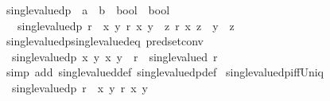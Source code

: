 \begin{isabellebody}
\isanewline
{}\isamarkupfalse%
\ single{\isacharunderscore}{\kern0pt}valuedp\ {\isacharcolon}{\kern0pt}{\isacharcolon}{\kern0pt}\ {\isachardoublequoteopen}{\isacharparenleft}{\kern0pt}{\isacharprime}{\kern0pt}a\ {\isasymRightarrow}\ {\isacharprime}{\kern0pt}b\ {\isasymRightarrow}\ bool{\isacharparenright}{\kern0pt}\ {\isasymRightarrow}\ bool{\isachardoublequoteclose}\isanewline
\ \ \ {\isachardoublequoteopen}single{\isacharunderscore}{\kern0pt}valuedp\ r\ {\isasymlongleftrightarrow}\ {\isacharparenleft}{\kern0pt}{\isasymforall}x\ y{\isachardot}{\kern0pt}\ r\ x\ y\ {\isasymlongrightarrow}\ {\isacharparenleft}{\kern0pt}{\isasymforall}z{\isachardot}{\kern0pt}\ r\ x\ z\ {\isasymlongrightarrow}\ y\ {\isacharequal}{\kern0pt}\ z{\isacharparenright}{\kern0pt}{\isacharparenright}{\kern0pt}{\isachardoublequoteclose}\isanewline
\isanewline
{}\isamarkupfalse%
\ single{\isacharunderscore}{\kern0pt}valuedp{\isacharunderscore}{\kern0pt}single{\isacharunderscore}{\kern0pt}valued{\isacharunderscore}{\kern0pt}eq\ {\isacharbrackleft}{\kern0pt}pred{\isacharunderscore}{\kern0pt}set{\isacharunderscore}{\kern0pt}conv{\isacharbrackright}{\kern0pt}{\isacharcolon}{\kern0pt}\isanewline
\ \ {\isachardoublequoteopen}single{\isacharunderscore}{\kern0pt}valuedp\ {\isacharparenleft}{\kern0pt}{\isasymlambda}x\ y{\isachardot}{\kern0pt}\ {\isacharparenleft}{\kern0pt}x{\isacharcomma}{\kern0pt}\ y{\isacharparenright}{\kern0pt}\ {\isasymin}\ r{\isacharparenright}{\kern0pt}\ {\isasymlongleftrightarrow}\ single{\isacharunderscore}{\kern0pt}valued\ r{\isachardoublequoteclose}\isanewline
%
\isadelimproof
\ \ %
\endisadelimproof
%
\isatagproof
{}\isamarkupfalse%
\ {\isacharparenleft}{\kern0pt}simp\ add{\isacharcolon}{\kern0pt}\ single{\isacharunderscore}{\kern0pt}valued{\isacharunderscore}{\kern0pt}def\ single{\isacharunderscore}{\kern0pt}valuedp{\isacharunderscore}{\kern0pt}def{\isacharparenright}{\kern0pt}%
\endisatagproof
{\isafoldproof}%
%
\isadelimproof
\isanewline
%
\endisadelimproof
\isanewline
{}\isamarkupfalse%
\ single{\isacharunderscore}{\kern0pt}valuedp{\isacharunderscore}{\kern0pt}iff{\isacharunderscore}{\kern0pt}Uniq{\isacharcolon}{\kern0pt}\isanewline
\ \ {\isachardoublequoteopen}single{\isacharunderscore}{\kern0pt}valuedp\ r\ {\isasymlongleftrightarrow}\ {\isacharparenleft}{\kern0pt}{\isasymforall}x{\isachardot}{\kern0pt}\ {\isasymexists}\isactrlsub {\isasymle}y{\isachardot}{\kern0pt}\ r\ x\ y{\isacharparenright}{\kern0pt}{\isachardoublequoteclose}\isanewline
%
\isadelimproof

\end{isabellebody}
